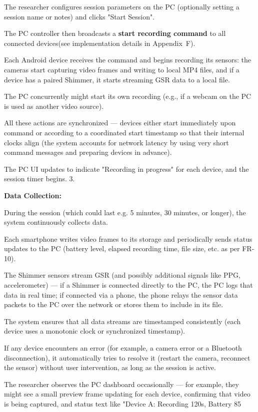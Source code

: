 The researcher configures session parameters on the PC (optionally setting a session name or notes) and clicks "Start Session".

The PC controller then broadcasts a \textbf{start recording command}
 to all connected devices(see implementation details in Appendix~F).

Each Android device receives the command and begins recording its sensors: the cameras start capturing video frames and writing to local MP4 files, and if a device has a paired Shimmer, it starts streaming GSR data to a local file.

The PC concurrently might start its own recording (e.g., if a webcam on the PC is used as another video source).

All these actions are synchronized --- devices either start immediately upon command or according to a coordinated start timestamp so that their internal clocks align (the system accounts for network latency by using very short command messages and preparing devices in advance).

The PC UI updates to indicate "Recording in progress" for each device, and the session timer begins. 3.

\textbf{Data Collection:}

During the session (which could last e.g. 5 minutes, 30 minutes, or longer), the system continuously collects data.

Each smartphone writes video frames to its storage and periodically sends status updates to the PC (battery level, elapsed recording time, file size, etc. as per FR-10).

The Shimmer sensors stream GSR (and possibly additional signals like PPG, accelerometer) --- if a Shimmer is connected directly to the PC, the PC logs that data in real time; if connected via a phone, the phone relays the sensor data packets to the PC over the network or stores them to include in its file.

The system ensures that all data streams are timestamped consistently (each device uses a monotonic clock or synchronized timestamp).

If any device encounters an error (for example, a camera error or a Bluetooth disconnection), it automatically tries to resolve it (restart the camera, reconnect the sensor) without user intervention, as long as the session is active.

The researcher observes the PC dashboard occasionally --- for example, they might see a small preview frame updating for each device, confirming that video is being captured, and status text like "Device A: Recording 120s, Battery 85%

